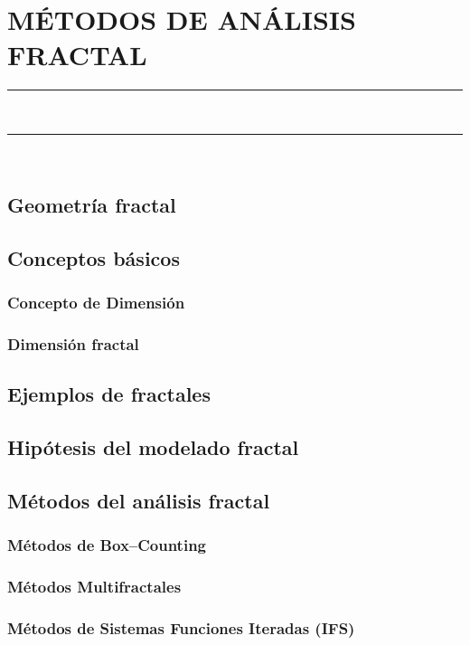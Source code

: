 \chapter{MÉTODOS DE ANÁLISIS FRACTAL}\label{cap:MetodosAnalisisFractal}
\noindent\rule{\linewidth}{1.3pt}\\
\startcontents[chapters]
\noindent\rule{\linewidth}{1.1pt}\\
\newpage
\section{Geometría fractal}\label{sec:GeometriaFractal}
\section{Conceptos básicos}\label{sec:ConceptosBasicosDimension}
\subsection{Concepto de Dimensión}
\subsection{Dimensión fractal}
\section{Ejemplos de fractales}\label{sec:EjemplosFractales}
\section{Hipótesis del modelado fractal}\label{sec:HipotesisModeladoFractal}
\section{Métodos del análisis fractal}\label{sec:MetodosAnalisisFractal}
\subsection{Métodos de Box--Counting}
\subsection{Métodos Multifractales}
\subsection{Métodos de Sistemas Funciones Iteradas (IFS)}
